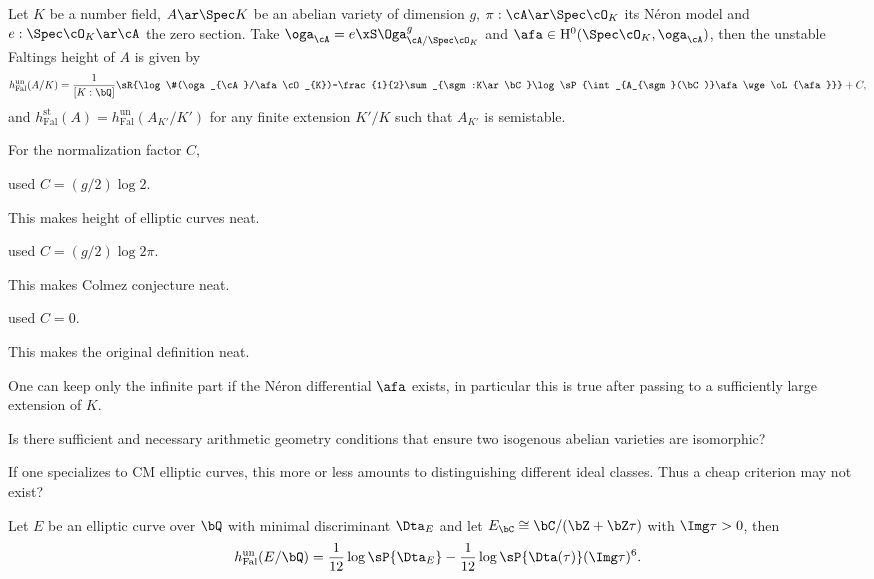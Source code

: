 \documentclass[a4paper, twoside]{article}
\begin{document}
\begin{dfn}
	Let $K$ be a number field, $A\ar\Spec K$ be an abelian variety of dimension $g$, $\pi:\cA\ar\Spec\cO_{K}$ its N{\'e}ron model and $e:\Spec\cO_{K}\ar\cA$ the zero section. Take $\oga_{\cA}=e\xS \Oga_{\cA/\Spec\cO_{K}}^{g}$ and $\afa\in \mathrm{H}_{}^{0}(\Spec\cO_{K},\oga_{\cA})$, then the unstable Faltings height of $A$ is given by
	\[
		h_{\mathrm{Fal}}^{\mathrm{un}}(A/K)=\frac{1}{[K:\bQ]}\sR{\log\#(\oga_{\cA}/\afa\cO_{K})-\frac{1}{2}\sum_{\sgm:K\ar\bC}\log\sP{\int_{A_{\sgm}(\bC)}\afa\wge\oL{\afa}}}+C,
	\]
	and $h_{\mathrm{Fal}}^{\mathrm{st}}(A)=h_{\mathrm{Fal}}^{\mathrm{un}}(A_{K'}/K')$ for any finite extension $K'/K$ such that $A_{K'}$ is semistable.
\end{dfn}
\begin{rmk}
	For the normalization factor $C$,
	\begin{itm}
		\item \cite{Faltings1983,Silverman1986,SU1999,Ullmo2000} used $C=(g/2)\log{2}$.

		This makes height of elliptic curves neat.
		\item \cite{Yang2010Colmez,Yang2010Hilbert,YZ2018,YZ2021,Yuan2021Bigness} used $C=(g/2)\log{2\pi}$.

		This makes Colmez conjecture neat.
		\item \cite{Colmez1993,Colmez1998Hauteur,AGHMP2018} used $C=0$.

		This makes the original definition neat.
	\end{itm}
\end{rmk}

\begin{rmk}
	One can keep only the infinite part if the N{\'e}ron differential $\afa$ exists, in particular this is true after passing to a sufficiently large extension of $K$.
\end{rmk}

\begin{qst}
	Is there sufficient and necessary arithmetic geometry conditions that ensure two isogenous abelian varieties are isomorphic?

	If one specializes to CM elliptic curves, this more or less amounts to distinguishing different ideal classes. Thus a cheap criterion may not exist?
\end{qst}


\begin{thm}
	Let $E$ be an elliptic curve over $\bQ$ with minimal discriminant $\Dta_{E}$ and let $E_{\bC}\cong\bC/(\bZ+\bZ\tau)$ with $\Img\tau>0$, then
	\[
		h_{\mathrm{Fal}}^{\mathrm{un}}(E/\bQ)=\frac{1}{12}\log\sP{\Dta_{E}}-\frac{1}{12}\log\sP{\Dta(\tau)}(\Img\tau)^{6}.
	\]
\end{thm}
\end{document}
